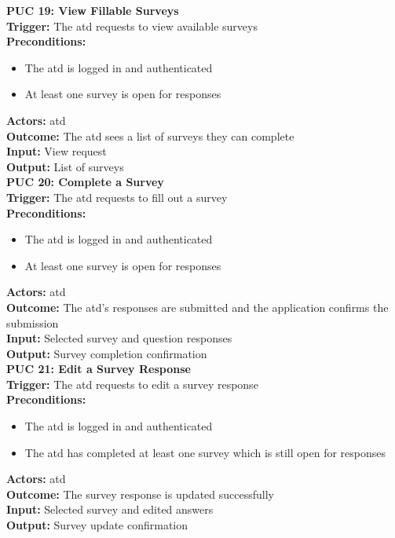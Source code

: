 \documentclass[12pt]{article}
\begin{document}
{\textbf{PUC 19: View Fillable Surveys} \\
\textbf{Trigger:} The \gls{atd} requests to view available surveys \\
\textbf{Preconditions:}
\begin{itemize}
  \item The \gls{atd} is logged in and authenticated
  \item At least one survey is open for responses
\end{itemize}
\textbf{Actors:} \Gls{atd} \\
\textbf{Outcome:} The \gls{atd} sees a list of surveys they can complete \\
\textbf{Input:} View request \\
\textbf{Output:} List of surveys \\[1em]

\textbf{PUC 20: Complete a Survey} \\
\textbf{Trigger:} The \gls{atd} requests to fill out a survey \\
\textbf{Preconditions:}
\begin{itemize}
  \item The \gls{atd} is logged in and authenticated
  \item At least one survey is open for responses
\end{itemize}
\textbf{Actors:} \Gls{atd} \\
\textbf{Outcome:} The \gls{atd}’s responses are submitted and the application confirms the submission \\
\textbf{Input:} Selected survey and question responses \\
\textbf{Output:} Survey completion confirmation \\[1em]

\textbf{PUC 21: Edit a Survey Response} \\
\textbf{Trigger:} The \gls{atd} requests to edit a survey response \\
\textbf{Preconditions:}
\begin{itemize}
  \item The \gls{atd} is logged in and authenticated
  \item The \gls{atd} has completed at least one survey which is still open for responses
\end{itemize}
\textbf{Actors:} \Gls{atd} \\
\textbf{Outcome:} The survey response is updated successfully \\
\textbf{Input:} Selected survey and edited answers \\
\textbf{Output:} Survey update confirmation \\[1em]

}
\end{document}
